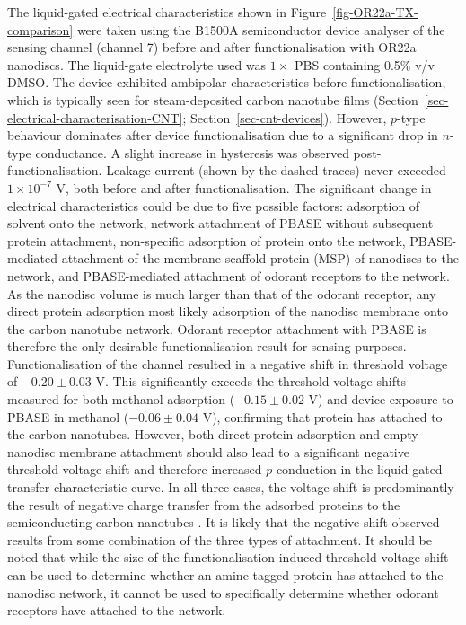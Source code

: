 \documentclass[
  a4paper,
]{scrbook}
\begin{document}
The liquid-gated electrical characteristics shown in
Figure~\ref{fig-OR22a-TX-comparison} were taken using the B1500A
semiconductor device analyser of the sensing channel (channel 7) before
and after functionalisation with OR22a nanodiscs. The liquid-gate
electrolyte used was \(1 \times\) PBS containing 0.5\% v/v DMSO. The
device exhibited ambipolar characteristics before functionalisation,
which is typically seen for steam-deposited carbon nanotube films
(Section~\ref{sec-electrical-characterisation-CNT};
Section~\ref{sec-cnt-devices}). However, \(p\)-type behaviour dominates
after device functionalisation due to a significant drop in \(n\)-type
conductance. A slight increase in hysteresis was observed
post-functionalisation. Leakage current (shown by the dashed traces)
never exceeded \(1 \times 10^{-7}\) V, both before and after
functionalisation. The significant change in electrical characteristics
could be due to five possible factors: adsorption of solvent onto the
network, network attachment of PBASE without subsequent protein
attachment, non-specific adsorption of protein onto the network,
PBASE-mediated attachment of the membrane scaffold protein (MSP) of
nanodiscs to the network, and PBASE-mediated attachment of odorant
receptors to the network. As the nanodisc volume is much larger than
that of the odorant receptor, any direct protein adsorption most likely
adsorption of the nanodisc membrane onto the carbon nanotube network.
Odorant receptor attachment with PBASE is therefore the only desirable
functionalisation result for sensing purposes. Functionalisation of the
channel resulted in a negative shift in threshold voltage of
\(-0.20\pm0.03\) V. This significantly exceeds the threshold voltage
shifts measured for both methanol adsorption (\(-0.15\pm0.02\) V) and
device exposure to PBASE in methanol (\(-0.06\pm0.04\) V), confirming
that protein has attached to the carbon nanotubes. However, both direct
protein adsorption \autocite{Bradley2004,Heller2008,Kauffman2008} and
empty nanodisc membrane attachment \autocite{Murugathas2019a} should
also lead to a significant negative threshold voltage shift and
therefore increased \(p\)-conduction in the liquid-gated transfer
characteristic curve. In all three cases, the voltage shift is
predominantly the result of negative charge transfer from the adsorbed
proteins to the semiconducting carbon nanotubes
\autocite{Bradley2004,Heller2008,Murugathas2019a}. It is likely that the
negative shift observed results from some combination of the three types
of attachment. It should be noted that while the size of the
functionalisation-induced threshold voltage shift can be used to
determine whether an amine-tagged protein has attached to the nanodisc
network, it cannot be used to specifically determine whether odorant
receptors have attached to the network.
\end{document}
